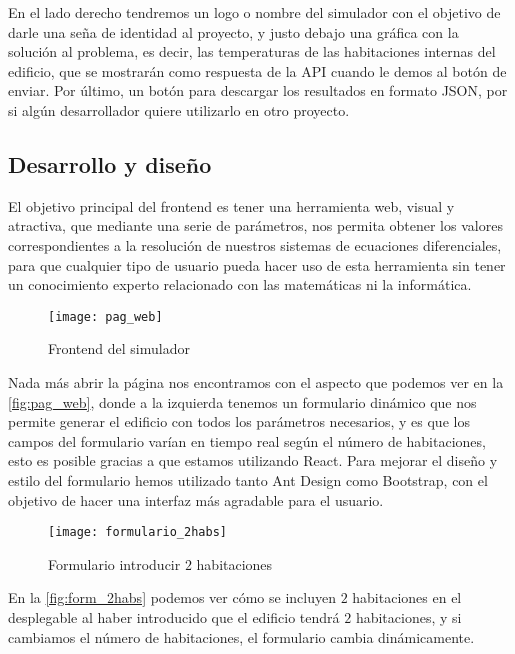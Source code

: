 En el lado derecho tendremos un logo o nombre del simulador con el objetivo de darle una seña de identidad al proyecto, y justo debajo una gráfica con la solución al problema, es decir, las temperaturas de las habitaciones internas del edificio, que se mostrarán como respuesta de la API cuando le demos al botón de enviar. Por último, un botón para descargar los resultados en formato JSON, por si algún desarrollador quiere utilizarlo en otro proyecto.
\subsection{Desarrollo y diseño}
El objetivo principal del frontend es tener una herramienta web, visual y atractiva, que mediante una serie de parámetros, nos permita obtener los valores correspondientes a la resolución de nuestros sistemas de ecuaciones diferenciales, para que cualquier tipo de usuario pueda hacer uso de esta herramienta sin tener un conocimiento experto relacionado con las matemáticas ni la informática.

\begin{figure}[h!]
	\centering
	\texttt{[image: pag\_web]}
	\caption{Frontend del simulador}
	\label{fig:pag_web}
\end{figure}

Nada más abrir la página nos encontramos con el aspecto que podemos ver en la \autoref{fig:pag_web}, donde a la izquierda tenemos un formulario dinámico que nos permite generar el edificio con todos los parámetros necesarios, y es que los campos del formulario varían en tiempo real según el número de habitaciones, esto es posible gracias a que estamos utilizando React. Para mejorar el diseño y estilo del formulario hemos utilizado tanto Ant Design como Bootstrap, con el objetivo de hacer una interfaz más agradable para el usuario.
\begin{figure}[h!]
	\centering
	\texttt{[image: formulario\_2habs]}
	\caption{Formulario introducir $2$ habitaciones}
	\label{fig:form_2habs}
\end{figure}
En la \autoref{fig:form_2habs} podemos ver cómo se incluyen $2$ habitaciones en el desplegable al haber introducido que el edificio tendrá $2$ habitaciones, y si cambiamos el número de habitaciones, el formulario cambia dinámicamente.

